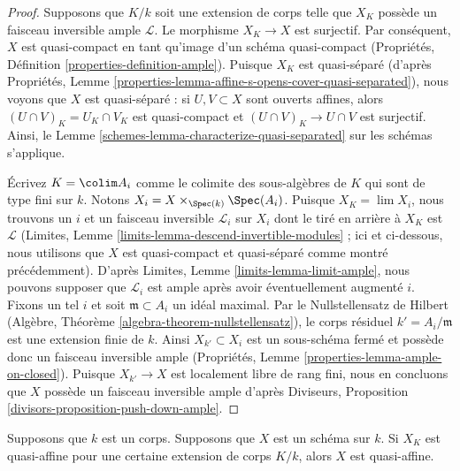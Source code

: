 \begin{proof}
Supposons que $K/k$ soit une extension de corps telle que
$X_K$ possède un faisceau inversible ample $\mathcal{L}$. Le
morphisme $X_K \to X$ est surjectif. Par conséquent, $X$ est
quasi-compact en tant qu'image d'un schéma quasi-compact
(Propriétés, Définition \ref{properties-definition-ample}).
Puisque $X_K$ est quasi-séparé (d'après Propriétés, Lemme
\ref{properties-lemma-affine-s-opens-cover-quasi-separated}), nous
voyons que $X$ est quasi-séparé : si $U, V \subset X$ sont ouverts
affines, alors $(U \cap V)_K = U_K \cap V_K$ est quasi-compact et
$(U \cap V)_K \to U \cap V$ est surjectif. Ainsi, le Lemme
\ref{schemes-lemma-characterize-quasi-separated} sur les schémas s'applique.

\medskip\noindent
Écrivez $K = \colim A_i$ comme le colimite des sous-algèbres de
$K$ qui sont de type fini sur $k$. Notons $X_i = X
\times_{\Spec(k)} \Spec(A_i)$. Puisque $X_K = \lim X_i$, nous
trouvons un $i$ et un faisceau inversible $\mathcal{L}_i$ sur
$X_i$ dont le tiré en arrière à $X_K$ est $\mathcal{L}$
(Limites, Lemme \ref{limits-lemma-descend-invertible-modules} ;
ici et ci-dessous, nous utilisons que $X$ est quasi-compact et
quasi-séparé comme montré précédemment). D'après Limites, Lemme
\ref{limits-lemma-limit-ample}, nous pouvons supposer que
$\mathcal{L}_i$ est ample après avoir éventuellement augmenté
$i$. Fixons un tel $i$ et soit $\mathfrak m \subset A_i$ un idéal
maximal. Par le Nullstellensatz de Hilbert (Algèbre, Théorème
\ref{algebra-theorem-nullstellensatz}), le corps résiduel $k' =
A_i/\mathfrak m$ est une extension finie de $k$. Ainsi $X_{k'}
\subset X_i$ est un sous-schéma fermé et possède donc un faisceau
inversible ample (Propriétés, Lemme
\ref{properties-lemma-ample-on-closed}). Puisque $X_{k'} \to X$ est localement
libre de rang fini, nous en concluons que $X$ possède un faisceau inversible
ample d’après Diviseurs, Proposition \ref{divisors-proposition-push-down-ample}.
\end{proof}

\begin{lemma}
\label{lemma-quasi-affine-after-field-extension}
Supposons que $k$ est un corps. Supposons que $X$ est un schéma sur $k$. Si $X_K$ est
quasi-affine pour une certaine extension de corps $K/k$, alors $X$ est quasi-affine.
\end{lemma}

